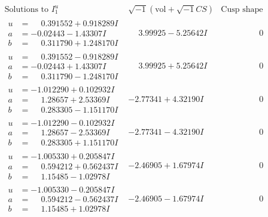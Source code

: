\documentclass[1p]{elsarticle_modified}
\theoremstyle{definition}
\newcommand{\I}{\sqrt{-1}}
\begin{document}
$$\begin{array}{c|c|c}  
\text{Solutions to }I^u_{1}& \I (\text{vol} + \sqrt{-1}CS) & \text{Cusp shape}\\
 \hline 
\begin{aligned}
u &= \phantom{-}0.391552 + 0.918289 I \\
a &= -0.02443 - 1.43307 I \\
b &= \phantom{-}0.311790 + 1.248170 I\end{aligned}
 & \phantom{-}3.99925 - 5.25642 I & \phantom{-0.000000 } 0 \\ \hline\begin{aligned}
u &= \phantom{-}0.391552 - 0.918289 I \\
a &= -0.02443 + 1.43307 I \\
b &= \phantom{-}0.311790 - 1.248170 I\end{aligned}
 & \phantom{-}3.99925 + 5.25642 I & \phantom{-0.000000 } 0 \\ \hline\begin{aligned}
u &= -1.012290 + 0.102932 I \\
a &= \phantom{-}1.28657 + 2.53369 I \\
b &= \phantom{-}0.283305 - 1.151170 I\end{aligned}
 & -2.77341 + 4.32190 I & \phantom{-0.000000 } 0 \\ \hline\begin{aligned}
u &= -1.012290 - 0.102932 I \\
a &= \phantom{-}1.28657 - 2.53369 I \\
b &= \phantom{-}0.283305 + 1.151170 I\end{aligned}
 & -2.77341 - 4.32190 I & \phantom{-0.000000 } 0 \\ \hline\begin{aligned}
u &= -1.005330 + 0.205847 I \\
a &= \phantom{-}0.594212 + 0.562437 I \\
b &= \phantom{-}1.15485 - 1.02978 I\end{aligned}
 & -2.46905 + 1.67974 I & \phantom{-0.000000 } 0 \\ \hline\begin{aligned}
u &= -1.005330 - 0.205847 I \\
a &= \phantom{-}0.594212 - 0.562437 I \\
b &= \phantom{-}1.15485 + 1.02978 I\end{aligned}
 & -2.46905 - 1.67974 I & \phantom{-0.000000 } 0 \\ \hline\begin{aligned}

\end{aligned}
\end{array}$$
\end{document}

